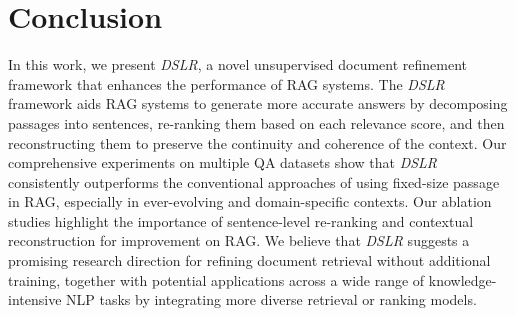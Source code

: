 
\section{Conclusion}



In this work, we present \textit{DSLR}, a novel unsupervised document refinement framework that enhances the performance of RAG systems. The \textit{DSLR} framework aids RAG systems to generate more accurate answers by decomposing passages into sentences, re-ranking them based on each relevance score, and then reconstructing them to preserve the continuity and coherence of the context. Our comprehensive experiments on multiple QA datasets show that \textit{DSLR} consistently outperforms the conventional approaches of using fixed-size passage in RAG, especially in ever-evolving and domain-specific contexts. Our ablation studies highlight the importance of sentence-level re-ranking and contextual reconstruction for improvement on RAG. We believe that \textit{DSLR} suggests a promising research direction for refining document retrieval without additional training, together with potential applications across a wide range of knowledge-intensive NLP tasks by integrating more diverse retrieval or ranking models. %